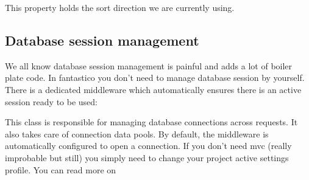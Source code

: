 \documentclass[letterpaper,10pt,english]{sphinxmanual}
\begin{document}
\begin{fulllineitems}
\begin{fulllineitems}
\end{fulllineitems}


\begin{fulllineitems}
\label{features/mvc:fantastico.mvc.models.model_sort.ModelSort.sort_dir}
This property holds the sort direction we are currently using.

\end{fulllineitems}


\end{fulllineitems}



\subsection{Database session management}
\label{features/mvc:database-session-management}
We all know database session management is painful and adds a lot of boiler plate code. In fantastico you don't need
to manage database session by yourself. There is a dedicated middleware which automatically ensures there is an
active session ready to be used:

\begin{fulllineitems}
\label{features/mvc:fantastico.middleware.model_session_middleware.ModelSessionMiddleware}
This class is responsible for managing database connections across requests. It also takes care of 
connection data pools. By default, the middleware is automatically configured to open a connection. If
you don't need mvc (really improbable but still) you simply need to change your project active settings
profile. You can read more on {\hyperref[get_started/settings:fantastico.settings.BasicSettings]{}}

\end{fulllineitems}
\end{document}
